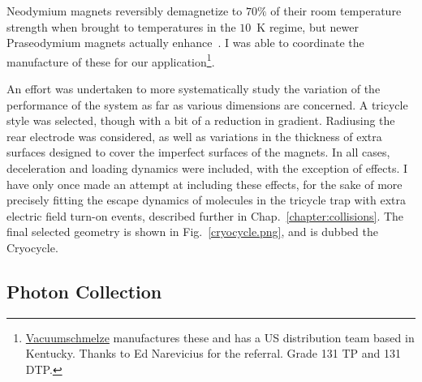 Neodymium magnets reversibly demagnetize to $70\%$ of their room temperature strength when brought to temperatures in the $10$~K regime, but newer Praseodymium magnets actually enhance~\cite{Shea2010}.
I was able to coordinate the manufacture of these for our application\footnote{\href{https://www.vacuumschmelze.com}{Vacuumschmelze} manufactures these and has a US distribution team based in Kentucky. Thanks to Ed Narevicius for the referral. Grade 131 TP and 131 DTP.}.

An effort was undertaken to more systematically study the variation of the performance of the system as far as various dimensions are concerned.
A tricycle style was selected, though with a bit of a reduction in gradient.
Radiusing the rear electrode was considered, as well as variations in the thickness of extra surfaces designed to cover the imperfect surfaces of the magnets.
In all cases, deceleration and loading dynamics were included, with the exception of  effects.
I have only once made an attempt at including these effects, for the sake of more precisely fitting the escape dynamics of molecules in the tricycle trap with extra electric field turn-on events, described further in Chap.~\ref{chapter:collisions}.
The final selected geometry is shown in Fig.~\ref{cryocycle.png}, and is dubbed the Cryocycle.


\subsection{Photon Collection}

